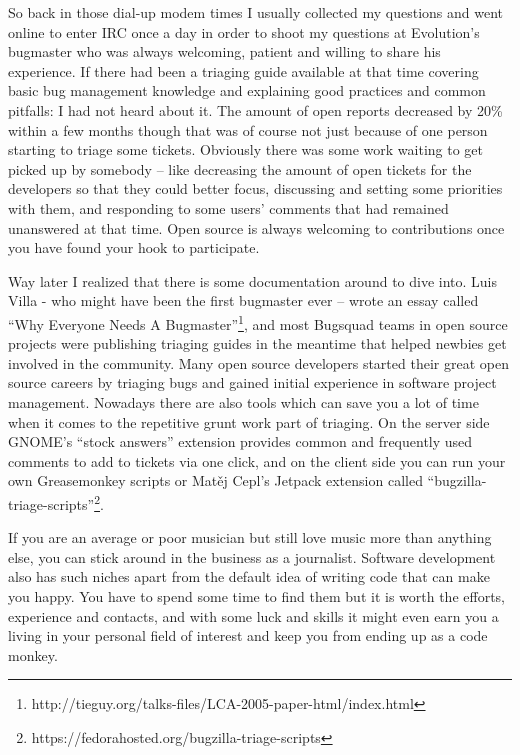 So back in those dial-up modem times I usually collected my questions and went
online to enter IRC once a day in order to shoot my questions at Evolution's
bugmaster who was always welcoming, patient and willing to share his experience.
If there had been a triaging guide available at that time covering basic bug
management knowledge and explaining good practices and common pitfalls: I had
not heard about it.
The amount of open reports decreased by 20\% within a few months though that was
of course not just because of one person starting to triage some tickets.
Obviously there was some work waiting to get picked up by somebody -- like
decreasing the amount of open tickets for the developers so that they could
better focus, discussing and setting some priorities with them, and responding
to some users' comments that had remained unanswered at that time. Open source
is always welcoming to contributions once you have found your hook to
participate.

Way later I realized that there is some documentation around to dive into. Luis
Villa - who might have been the first bugmaster ever -- wrote an essay called
``Why Everyone Needs A
Bugmaster''\footnote{{
http://tieguy.org/talks-files/LCA-2005-paper-html/index.html}}, and most
Bugsquad teams in open source projects were publishing triaging guides in the
meantime that helped newbies get involved in the community. Many open source
developers started their great open source careers by triaging bugs and gained
initial experience in software project management.
Nowadays there are also tools which can save you a lot of time when it comes to
the repetitive grunt work part of triaging. On the server side GNOME's ``stock
answers'' extension provides common and frequently used comments to add to
tickets via one click, and on the client side you can run your own Greasemonkey
scripts or Matěj Cepl's Jetpack extension called
``bugzilla-triage-scripts''\footnote{{
https://fedorahosted.org/bugzilla-triage-scripts}}.

If you are an average or poor musician but still love music more than anything
else, you can stick around in the business as a journalist.
Software development also has such niches apart from the default idea of writing
code that can make you happy. You have to spend some time to find them but it is
worth the efforts, experience and contacts, and with some luck and skills it
might even earn you a living in your personal field of interest and keep you
from ending up as a code monkey.
